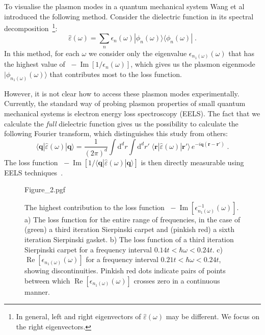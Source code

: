 To visualise the plasmon modes in a quantum mechanical system Wang et al~\cite{wang_plasmonic_2015} introduced the following method. Consider the dielectric function in its spectral decomposition~\footnote{In general, left and right eigenvectors of $\hat\varepsilon(\omega)$ may be different. We focus on the right eigenvectors.}:
\begin{equation}
    \hat\varepsilon(\omega) = \sum_n \epsilon_n(\omega)|\phi_n(\omega)\rangle \langle\phi_n(\omega)|
        \;.
\end{equation}
In this method, for each $\omega$ we consider only the eigenvalue $\epsilon_{n_1(\omega)}(\omega)$ that has the highest value of $\;-\operatorname{Im}[1/\epsilon_n(\omega)]$, which gives us the plasmon eigenmode $|\phi_{n_1(\omega)}(\omega)\rangle$ that contributes most to the loss function.

However, it is not clear how to access these plasmon modes experimentally. Currently, the standard way of probing plasmon properties of small quantum mechanical systems is electron energy loss spectroscopy (EELS).  The fact that we calculate the \emph{full} dielectric function gives us the possibility to calculate the following Fourier transform, which distinguishes this study from others:
\begin{equation}
    \langle\mathbf{q} |\hat\varepsilon(\omega)| \mathbf{q}\rangle
        = \frac{1}{(2\pi)^d} \int\!\!\text{d}^d r \!\!\!\int\!\!\text{d}^d r'\;
            \langle\mathbf{r} |\hat\varepsilon(\omega)| \mathbf{r'}\rangle\,
                e^{-i\mathbf{q}(\mathbf{r} - \mathbf{r'})} \; .
\end{equation}
The loss function $\; -\operatorname{Im}[1 / \langle\mathbf{q}|\hat\varepsilon(\omega)| \mathbf{q}\rangle]$ is then directly measurable using EELS techniques~\cite{nozieres1999theory,platzman1973waves,Vonsov2012QuantumSolidS,giuliani2005quantum,lu2009plasmon}.

\begin{figure}[h]
    \centering
    {Figure_2.pgf}
    \caption{The highest contribution to the loss function $\;-\operatorname{Im}[\epsilon^{-1}_{n_1(\omega)} (\omega)]$. a) The loss function for the entire range of frequencies, in the case of (green) a third iteration Sierpinski carpet and (pinkish red) a sixth iteration Sierpinski gasket. b) The loss function of a third iteration Sierpinski carpet for a frequency interval $0.14t < \hbar\omega < 0.24t$. c) $\operatorname{Re}[\epsilon_{n_1(\omega)} (\omega)]$ for a frequency interval $0.21t < \hbar\omega < 0.24t$, showing discontinuities. Pinkish red dots indicate pairs of points between which $\operatorname{Re}[\epsilon_{n_1(\omega)}(\omega)]$ crosses zero in a continuous manner.}
    \label{fig:prb18:spectrum}
\end{figure}

